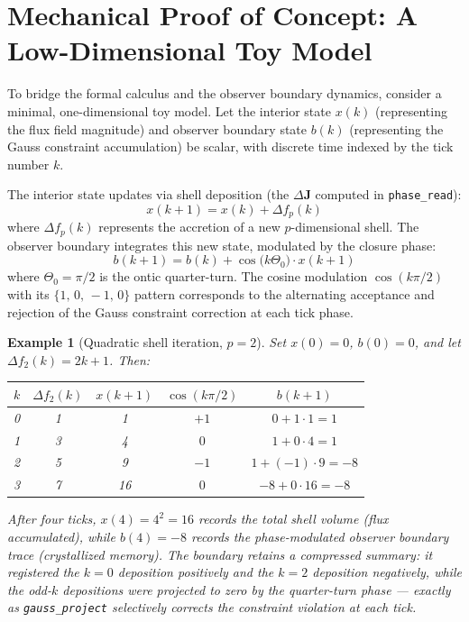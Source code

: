 \documentclass[11pt]{article}
\theoremstyle{tight}
\theoremstyle{plainroman}
\newtheorem{example}[theorem]{Example}
\newcommand{\Thetaont}{\Theta_{0}}
\begin{document}
\section{Mechanical Proof of Concept: A Low-Dimensional Toy Model}

To bridge the formal calculus and the observer boundary dynamics, consider a minimal, one-dimensional toy model.
Let the interior state $x(k)$ (representing the flux field magnitude) and observer boundary state $b(k)$ (representing the Gauss constraint accumulation) be scalar, with discrete time indexed by the tick number $k$.

The interior state updates via shell deposition (the $\Delta\mathbf J$ computed in \texttt{phase\_read}):
\[
x(k+1) = x(k) + \Delta f_p(k)
\]
where $\Delta f_p(k)$ represents the accretion of a new $p$-dimensional shell.
The observer boundary integrates this new state, modulated by the closure phase:
\[
b(k+1) = b(k) + \cos\!\bigl(k\Thetaont\bigr) \cdot x(k+1)
\]
where $\Thetaont=\pi/2$ is the ontic quarter-turn.
The cosine modulation $\cos(k\pi/2)$ with its $\{1,\,0,\,-1,\,0\}$ pattern corresponds to the alternating acceptance and rejection of the Gauss constraint correction at each tick phase.

\begin{example}[Quadratic shell iteration, $p=2$]
Set $x(0)=0$, $b(0)=0$, and let $\Delta f_2(k)=2k+1$. Then:
\begin{center}
\renewcommand{\arraystretch}{1.18}
\begin{tabular}{ccccc}
\toprule
$k$ & $\Delta f_2(k)$ & $x(k{+}1)$ & $\cos(k\pi/2)$ & $b(k{+}1)$ \\
\midrule
0 & 1 & 1 & $+1$ & $0+1\cdot 1 = 1$ \\
1 & 3 & 4 & $0$ & $1+0\cdot 4 = 1$ \\
2 & 5 & 9 & $-1$ & $1+(-1)\cdot 9 = -8$ \\
3 & 7 & 16 & $0$ & $-8+0\cdot 16 = -8$ \\
\bottomrule
\end{tabular}
\end{center}
After four ticks, $x(4)=4^2=16$ records the total shell volume (flux accumulated), while $b(4)=-8$ records the phase-modulated observer boundary trace (crystallized memory).
The boundary retains a compressed summary: it registered the $k=0$ deposition positively and the $k=2$ deposition negatively, while the odd-$k$ depositions were projected to zero by the quarter-turn phase --- exactly as \texttt{gauss\_project} selectively corrects the constraint violation at each tick.
\end{example}
\end{document}
